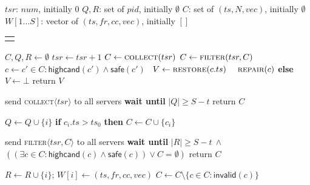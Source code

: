\documentclass[10pt,conference,compsocconf]{IEEEtran}
\newcommand{\nonce}{N}
\begin{document}
\begin{algo}[t]
\small

\begin{distribalgo}[1] \setcounter{ALC@line}{\value{alg:client1:lines}}
\smallskip
{}
\STATE $tsr$: $num$, initially $0$
\STATE $Q,R$: set of $pid$, initially $\emptyset$
\STATE $C$: set of $(ts, \nonce, vec)$, initially $\emptyset$
\STATE $W[1 \dots S]$: vector of $(ts,fr,cc,vec)$, initially $[]$
\ENDINDENT
\setcounter{alg:client1:lines}{\value{ALC@line}}
\end{distribalgo}
\begin{tabular}{c}\hline\mbox{}\hspace{0.45\textwidth}\mbox{}\end{tabular}
\vspace{-2 em}
\begin{distribalgo}[1]   \setcounter{ALC@line}{\value{alg:client1:lines}}
\STATE $C,Q,R \leftarrow \emptyset$
\STATE $tsr \leftarrow tsr + 1$
\STATE $C \leftarrow \textsc{collect}(tsr)$
\STATE $C \leftarrow \textsc{filter}(tsr, C)$
\STATE $c \leftarrow c' \in C: \textsf{highcand}(c') \wedge \textsf{safe}(c')$~\label{alg2:reader:select}
\STATE $V \leftarrow \textsc{restore}(c.ts)$ ~\label{alg2:reader:restore}
\STATE $\textsc{repair}(c)$
\ENDIF
\STATE \textbf{else} $V \leftarrow \bot$
\STATE return $V$
\ENDINDENT

\smallskip
{}
\STATE send \textsc{collect}$\langle tsr \rangle$ to all servers
\STATE \textbf{wait until} $|Q| \geq S-t$
\STATE return $C$
\ENDINDENT

\smallskip
{}
\STATE $Q \leftarrow Q \cup \{ i \}$
\STATE \textbf{if} $c_i.ts > ts_0$ \textbf{then} $C \leftarrow C \cup \{c_i\}$
\ENDINDENT

\smallskip
{}
\STATE send \textsc{filter}$\langle tsr, C \rangle$ to all servers
\STATE \textbf{wait until} $|R| \geq S-t\ \wedge$\\ $((\exists c \in C: \textsf{highcand}(c) \wedge \textsf{safe}(c)) \vee C = \emptyset)$
\STATE return $C$
\ENDINDENT

\smallskip
{}
\STATE $R \leftarrow R \cup \{ i \}$; $W[i] \leftarrow (ts,fr,cc,vec)$
\STATE $C \leftarrow C \setminus \{c \in C: \textsf{invalid}(c) \}$
\ENDINDENT


\end{distribalgo}
\end{algo}
\end{document}
